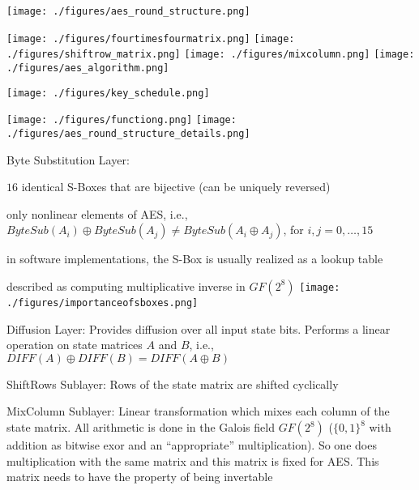 \documentclass[landscape, a4paper]{article}
\begin{document}
\begin{minipage}[t]{0.198\pagewidth}
\begin{betterlist}
\begin{betterlist}
		\end{betterlist}
		\begin{minipage}[b]{0.64\linewidth}
			\texttt{[image: ./figures/aes\_round\_structure.png]}
		\end{minipage}
		\begin{minipage}[b]{0.34\linewidth}
			\texttt{[image: ./figures/fourtimesfourmatrix.png]}
			\texttt{[image: ./figures/shiftrow\_matrix.png]}
			\texttt{[image: ./figures/mixcolumn.png]}
			\texttt{[image: ./figures/aes\_algorithm.png]}
		\end{minipage}
		\begin{minipage}[b]{0.49\linewidth}
			\texttt{[image: ./figures/key\_schedule.png]}
		\end{minipage}
		\begin{minipage}[b]{0.49\linewidth}
			\texttt{[image: ./figures/functiong.png]}
			\texttt{[image: ./figures/aes\_round\_structure\_details.png]}
		\end{minipage}
		\begin{betterlist}
			\item \alert{Byte Substitution Layer:}
			\begin{betterlist}
				\item $16$ \alert{identical} S-Boxes that are \alert{bijective} (can be \alert{uniquely reversed})
				\item only \alert{nonlinear} elements of AES, i.e., $ByteSub(A_i) \oplus ByteSub(A_j) \ne ByteSub(A_i \oplus A_j)$, for $i, j = 0,\ldots,15$
				\item in software implementations, the S-Box is usually realized as a lookup table
				\item described as computing \alert{multiplicative inverse} in $GF(2^8)$
				\texttt{[image: ./figures/importanceofsboxes.png]}
			\end{betterlist}
			\item \alert{Diffusion Layer:} Provides diffusion over all input state bits. Performs a linear operation on state matrices $A$ and $B$, i.e., $DIFF(A) \oplus DIFF(B) = DIFF(A \oplus B)$
			\begin{betterlist}
				\item \alert{ShiftRows Sublayer:} Rows of the state matrix are shifted cyclically
				\item \alert{MixColumn Sublayer:} Linear transformation which mixes each column of the state matrix. All arithmetic is done in the Galois field $GF(2^8)$ ($\{0, 1\}^8$ with addition as bitwise exor and an \enquote{appropriate} multiplication). So one does multiplication with the same matrix and this matrix is fixed for AES. This matrix needs to have the property of being \alert{invertable}

\end{betterlist}
\end{betterlist}
\end{betterlist}
\end{minipage}
\end{document}

